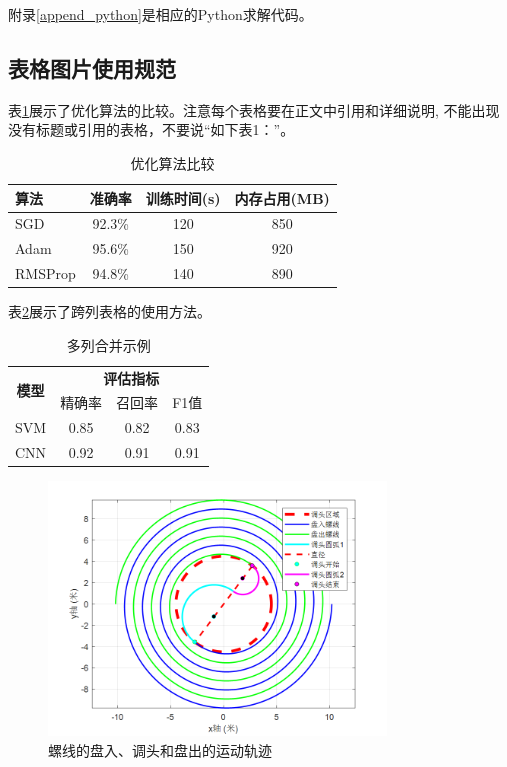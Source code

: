 \documentclass{JYU} %
\begin{document}
附录\ref{append_python}是相应的Python求解代码。


\subsection{表格图片使用规范}
表\ref{tab_algo}展示了优化算法的比较。注意每个表格要在正文中引用和详细说明, 不能出现没有标题或引用的表格，不要说“如下表1：”。
\begin{table}[!htbp]
	\caption{优化算法比较}
	\label{tab_algo}
	\centering
	\begin{tabular}{lccc}
		\toprule[1.5pt]
		\textbf{算法} & \textbf{准确率} & \textbf{训练时间(s)} & \textbf{内存占用(MB)} \\
		\midrule[1pt]
		SGD & 92.3\% & 120 & 850 \\
		Adam & 95.6\% & 150 & 920 \\
		RMSProp & 94.8\% & 140 & 890 \\
		\bottomrule[1.5pt]
	\end{tabular}
\end{table}

表\ref{tab_class}展示了跨列表格的使用方法。
\begin{table}[!htbp]
	\caption{多列合并示例}
	\label{tab_class}
	\centering
	\begin{tabular}{cccc}
		\toprule
		\multirow{2}{*}{\textbf{模型}} & \multicolumn{3}{c}{\textbf{评估指标}} \\
		\cmidrule{2-4}
		& 精确率 & 召回率 & F1值 \\
		\midrule
		SVM & 0.85 & 0.82 & 0.83 \\
		CNN & 0.92 & 0.91 & 0.91 \\
		\bottomrule
	\end{tabular}
\end{table}


\begin{figure}[!htbp]
	\centering
	\includegraphics[width=0.8\textwidth]{./图片/论文图片/fig_track.png}
	\caption{螺线的盘入、调头和盘出的运动轨迹}\label{fig_track}
\end{figure}
\end{document}
